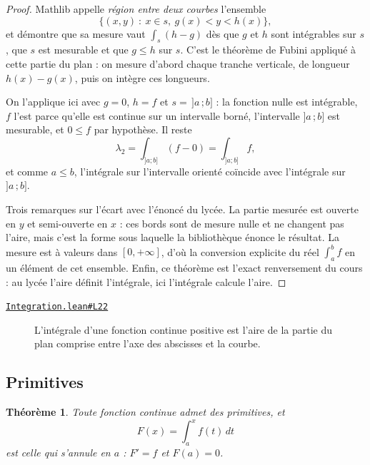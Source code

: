 \documentclass[11pt,a4paper]{article}
\theoremstyle{definition}
\theoremstyle{plain}
\newtheorem{theoreme}{Théorème}
\newcommand{\source}[2]{\par\smallskip\noindent\hfill{\footnotesize\href{#1}{\texttt{#2}}}\par\smallskip}
\begin{document}
\begin{proof}
Mathlib appelle \emph{région entre deux courbes} l'ensemble
\[ \{(x, y) \ :\ x \in s,\ g(x) < y < h(x)\} , \]
et démontre que sa mesure vaut $\int_s (h - g)$ dès que $g$ et $h$ sont intégrables sur
$s$, que $s$ est mesurable et que $g \le h$ sur $s$. C'est le théorème de Fubini appliqué
à cette partie du plan : on mesure d'abord chaque tranche verticale, de longueur
$h(x) - g(x)$, puis on intègre ces longueurs.

On l'applique ici avec $g = 0$, $h = f$ et $s = \,]a\,;b]$ : la fonction nulle est
intégrable, $f$ l'est parce qu'elle est continue sur un intervalle borné, l'intervalle
$]a\,;b]$ est mesurable, et $0 \le f$ par hypothèse. Il reste
\[ \lambda_2 = \int_{]a;b]} (f - 0) = \int_{]a;b]} f , \]
et comme $a \le b$, l'intégrale sur l'intervalle orienté coïncide avec l'intégrale sur
$]a\,;b]$.

\medskip\noindent
Trois remarques sur l'écart avec l'énoncé du lycée. La partie mesurée est ouverte en $y$
et semi-ouverte en $x$ : ces bords sont de mesure nulle et ne changent pas l'aire, mais
c'est la forme sous laquelle la bibliothèque énonce le résultat. La mesure est à valeurs
dans $[0, +\infty]$, d'où la conversion explicite du réel $\int_a^b f$ en un élément de cet
ensemble. Enfin, ce théorème est l'exact renversement du cours : au lycée l'aire définit
l'intégrale, ici l'intégrale calcule l'aire.
\end{proof}
\source{https://github.com/Commutator-IO/learn-lean/blob/main/courses/02-lycee/06-integration/Integration.lean\#L22}{Integration.lean\#L22}

\begin{figure}[h]
\centering

\caption{L'intégrale d'une fonction continue positive est l'aire de la partie du plan comprise entre l'axe des abscisses et la courbe.}
\end{figure}

\subsection{Primitives}

\begin{theoreme}
Toute fonction continue admet des primitives, et
\[ F(x) = \int_a^x f(t)\,dt \]
est celle qui s'annule en $a$ : $F' = f$ et $F(a) = 0$.
\end{theoreme}
\end{document}
